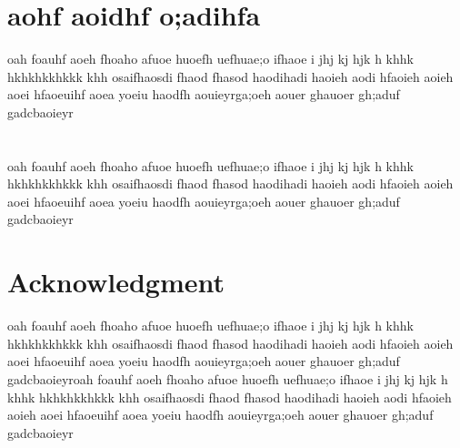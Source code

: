 \documentclass[journal]{IEEEtran}
\begin{document}
\appendices
\section{aohf aoidhf o;adihfa}
oah foauhf aoeh fhoaho  afuoe huoefh uefhuae;o ifhaoe i jhj kj hjk h khhk hkhkhkkhkkk khh  osaifhaosdi fhaod fhasod haodihadi haoieh aodi hfaoieh aoieh aoei hfaoeuihf aoea yoeiu haodfh aouieyrga;oeh aouer ghauoer gh;aduf gadcbaoieyr

\section{}
oah foauhf aoeh fhoaho  afuoe huoefh uefhuae;o ifhaoe i jhj kj hjk h khhk hkhkhkkhkkk khh  osaifhaosdi fhaod fhasod haodihadi haoieh aodi hfaoieh aoieh aoei hfaoeuihf aoea yoeiu haodfh aouieyrga;oeh aouer ghauoer gh;aduf gadcbaoieyr


\section*{Acknowledgment}


oah foauhf aoeh fhoaho  afuoe huoefh uefhuae;o ifhaoe i jhj kj hjk h khhk hkhkhkkhkkk khh  osaifhaosdi fhaod fhasod haodihadi haoieh aodi hfaoieh aoieh aoei hfaoeuihf aoea yoeiu haodfh aouieyrga;oeh aouer ghauoer gh;aduf gadcbaoieyroah foauhf aoeh fhoaho  afuoe huoefh uefhuae;o ifhaoe i jhj kj hjk h khhk hkhkhkkhkkk khh  osaifhaosdi fhaod fhasod haodihadi haoieh aodi hfaoieh aoieh aoei hfaoeuihf aoea yoeiu haodfh aouieyrga;oeh aouer ghauoer gh;aduf gadcbaoieyr


\ifCLASSOPTIONcaptionsoff
  \newpage
\fi




\end{document}
